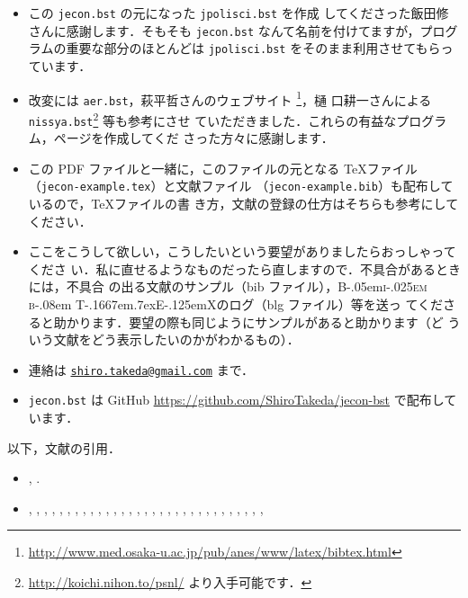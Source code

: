 \documentclass[article]{jlreq}
\newcommand{\BibTeX}{\textrm{B\kern-.05em\textsc{i\kern-.025em b}\kern-.08em%
T\kern-.1667em\lower.7ex\hbox{E}\kern-.125emX}}
\begin{document}
\begin{itemize}
 \item この \texttt{jecon.bst} の元になった \texttt{jpolisci.bst} を作成
       してくださった飯田修さんに感謝します．そもそも \texttt{jecon.bst} 
       なんて名前を付けてますが，プログラムの重要な部分のほとんどは
       \texttt{jpolisci.bst} をそのまま利用させてもらっています．
 \item 改変には \texttt{aer.bst}，萩平哲さんのウェブサイト
       \footnote{
       \url{http://www.med.osaka-u.ac.jp/pub/anes/www/latex/bibtex.html}}，樋
       口耕一さんによる \texttt{nissya.bst}\footnote{
       \url{http://koichi.nihon.to/psnl/} より入手可能です．} 等も参考にさせ
       ていただきました．これらの有益なプログラム，ページを作成してくだ
       さった方々に感謝します．
 \item この PDF ファイルと一緒に，このファイルの元となる \TeX ファイル 
      （\texttt{jecon-example.tex}）と文献ファイル 
      （\texttt{jecon-example.bib}）も配布しているので，\TeX ファイルの書
       き方，文献の登録の仕方はそちらも参考にしてください．
 \item ここをこうして欲しい，こうしたいという要望がありましたらおっしゃってくださ
       い．私に直せるようなものだったら直しますので．不具合があるときには，不具合
       の出る文献のサンプル（bib ファイル），\BibTeX のログ（blg ファイル）等を送っ
       てくださると助かります．要望の際も同じようにサンプルがあると助かります（ど
       ういう文献をどう表示したいのかがわかるもの）．
 \item 連絡は \texttt{\href{mailto:shiro.takeda@gmail.com}{shiro.takeda@gmail.com}} まで．
 \item \texttt{jecon.bst} は GitHub
       \url{https://github.com/ShiroTakeda/jecon-bst} で配布しています．
\end{itemize}

\vspace*{2em}

\nocite{*}

以下，文献の引用．
\begin{itemize}
 \item \citet{zhang2016Deep}, \citet{imbens2019Optimized}.
\end{itemize}

\begin{itemize}
 \item \citet{sample-test2},
\citet{sample-test},
\citet{oo100:_no_title},
\citet{oo99:_no_title},
\citet{120005678435},
\citet{120005614155},
\citet{Krey2014},
\citet{有村-蓬田2012},
\citet{森201206},
\citet{Jaeger2011},
\citet{Ades-2010-EnergyUseand},
\citet{松浦2010a},
\citet{bohringer2007measuring},
\citet{Ahman2007},
\citet{横溝2007},
\citet{Bohringer2006},
\citet{chuokankyo06jp:ccs},
\citet{瀧川2006a},
\citet{bouet06:_is_erosion_of_tarif_prefer_serious_concer},
\citet{Mcconnell2005},
\citet{Stokey2004},
\citet{Loschel2002},
\citet{ihori02:_japa_tax},
\citet{hardle_sweave:_2002},
\citet{nakamura00:_excel_io},
\citet{Iregui-1999-EFFICIENCYGAINSFROM},
\citet{okura96jp:nihon-no-zeisei},
\citet{MaggiRodr'iguez-Clare-1998-ValueofTrade},
\citet{shigen97:_energ_balan},
\citet{内田90},
\citet{samuelson67:_econo_found},
\citet{allais1953}
\end{itemize}
\end{document}

